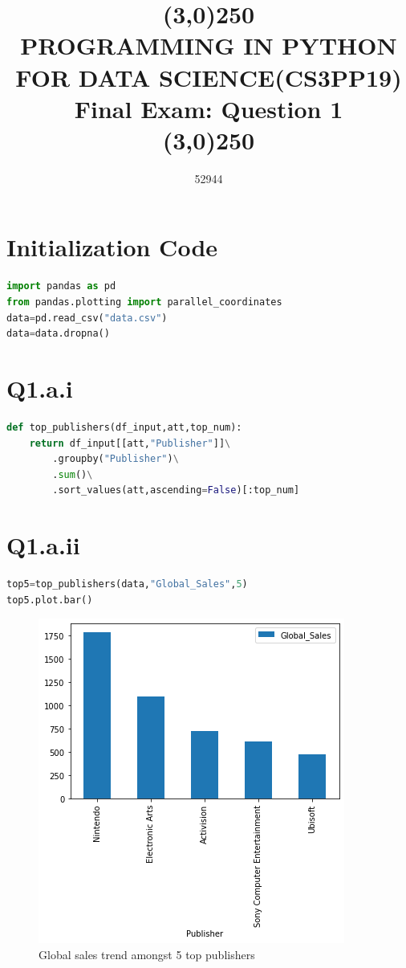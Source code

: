 \documentclass[openany]{article}
\title{\line(3,0){250}\\PROGRAMMING IN PYTHON FOR DATA SCIENCE(CS3PP19) \\ Final Exam: Question 1  \\\line(3,0){250}}
\author{52944}
\begin{document}
	\maketitle
	\section{Initialization Code}
	\begin{lstlisting}[language=Python]
import pandas as pd
from pandas.plotting import parallel_coordinates
data=pd.read_csv("data.csv")
data=data.dropna()
	\end{lstlisting}
	\section{Q1.a.i}
		\begin{lstlisting}[language=Python]
def top_publishers(df_input,att,top_num):
	return df_input[[att,"Publisher"]]\
		.groupby("Publisher")\
		.sum()\
		.sort_values(att,ascending=False)[:top_num]

		\end{lstlisting}
	\section{Q1.a.ii}
		\begin{lstlisting}[language=Python]
top5=top_publishers(data,"Global_Sales",5)
top5.plot.bar()
		\end{lstlisting}
		\begin{figure}[H]
			\iftrue
			\centering
			\caption{Global sales trend amongst 5 top publishers}
			\includegraphics[scale=0.5]{global-sales-trend}
			\fi
		\end{figure}
\end{document}
